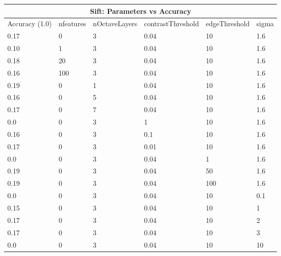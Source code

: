 \documentclass[12pt]{article}
\begin{document}
    \vspace*{0.5cm}
        \begin{tabular}{ |p{1.5cm}||p{3cm}|p{3cm}|p{3cm}|p{3cm}|p{2cm}|  }
            \hline
            \multicolumn{6}{|c|}{Sift: Parameters vs Accuracy} \\
            \hline
            Accuracy (1.0) & nfeatures & nOctaveLayers & contrastThreshold & edgeThreshold & sigma \\
            \hline
            0.17 & 0 & 3 & 0.04 & 10 & 1.6 \\
            \hline
            \hline
            0.10 & 1 & 3 & 0.04 & 10 & 1.6 \\
            \hline
            0.18 & 20 & 3 & 0.04 & 10 & 1.6 \\
            \hline
            0.16 & 100 & 3 & 0.04 & 10 & 1.6 \\
            \hline
            \hline
            0.19 & 0 & 1 & 0.04 & 10 & 1.6 \\
            \hline
            0.16 & 0 & 5 & 0.04 & 10 & 1.6 \\
            \hline
            0.17 & 0 & 7 & 0.04 & 10 & 1.6 \\
            \hline
            \hline
            0.0 & 0 & 3 & 1 & 10 & 1.6 \\
            \hline
            0.16 & 0 & 3 & 0.1 & 10 & 1.6 \\
            \hline
            0.17 & 0 & 3 & 0.01 & 10 & 1.6 \\
            \hline
            \hline
            0.0 & 0 & 3 & 0.04 & 1 & 1.6 \\
            \hline
            0.19 & 0 & 3 & 0.04 & 50 & 1.6 \\
            \hline
            0.19 & 0 & 3 & 0.04 & 100 & 1.6 \\
            \hline
            \hline
            0.0 & 0 & 3 & 0.04 & 10 & 0.1 \\
            \hline
            0.15 & 0 & 3 & 0.04 & 10 & 1 \\
            \hline
            0.17 & 0 & 3 & 0.04 & 10 & 2 \\
            \hline
            0.17 & 0 & 3 & 0.04 & 10 & 3 \\
            \hline
            0.0 & 0 & 3 & 0.04 & 10 & 10 \\
            \hline


            \hline
        \end{tabular}
\end{document}
